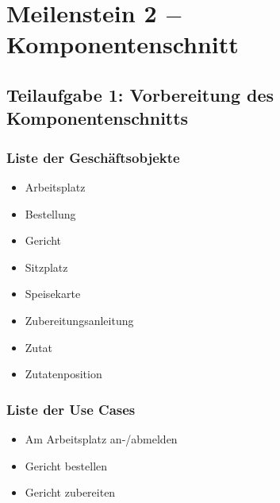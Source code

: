 \section{Meilenstein 2 $-$ Komponentenschnitt}

\subsection{Teilaufgabe 1: Vorbereitung des Komponentenschnitts}

\subsubsection{Liste der Gesch\"aftsobjekte}

\begin{itemize}

  \item Arbeitsplatz

  \item Bestellung

  \item Gericht

  \item Sitzplatz

  \item Speisekarte

  \item Zubereitungsanleitung

  \item Zutat

  \item Zutatenposition

\end{itemize}

\subsubsection{Liste der Use Cases}

\begin{itemize}

  \item Am Arbeitsplatz an-/abmelden

  \item Gericht bestellen

  \item Gericht zubereiten

\end{itemize}

